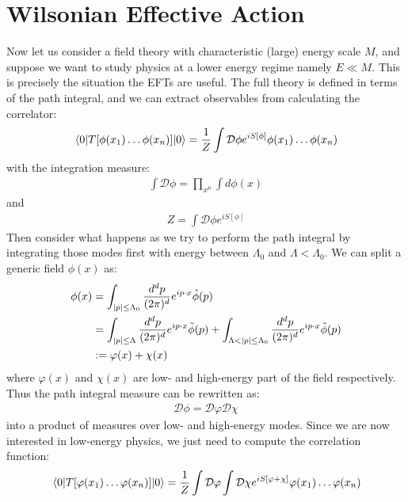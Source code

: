 \section{Wilsonian Effective Action}
Now let us consider a field theory with characteristic (large) energy scale $M$, and suppose we want to study physics at a lower energy regime namely $E \ll M$. This is precisely the situation the EFTs are useful. The full theory is defined in terms of the path integral, and we can extract observables from calculating the correlator:
\begin{align}
    \mel{0}{T[\phi(x_{1}) \dotso \phi(x_{n})]}{0} = \frac{1}{Z}\int \mathcal{D} \phi e^{iS[\phi]} \phi(x_{1}) \dots \phi(x_{n})
\end{align}
with the integration measure:
\begin{align}
    \int \mathcal{D}\phi = \prod_{x^{\mu}} \int d\phi(x)
\end{align}
and
\begin{align}
    Z = \int \mathcal{D}\phi e^{iS[\phi]}
\end{align}
Then consider what happens as we try to perform the path integral by integrating those modes first with energy between $\Lambda _{0}$ and $\Lambda < \Lambda_{0}$. We can split a generic field $\phi(x)$ as:
\begin{align}
    \begin{split}
        \phi(x) &= \int _{\abs{p} \le \Lambda_{0}} \frac{d^{d}p}{(2\pi)^{d}} e^{ip\cdot x} \tilde{\phi}(p) \\
        &= \int _{\abs{p} \le \Lambda} \frac{d^{d}p}{(2\pi)^{d}} e^{ip\cdot x} \tilde{\phi}(p) + \int _{\Lambda < \abs{p} \le \Lambda _{0}} \frac{d^{d}p}{(2\pi)^{d}} e^{ip\cdot x} \tilde{\phi}(p) \\
        & := \varphi (x) + \chi (x)
    \end{split}
\end{align}
where $\varphi(x)$ and $\chi(x)$ are low- and high-energy part of the field respectively. Thus the path integral measure can be rewritten as:
\begin{align}
    \mathcal{D}\phi = \mathcal{D} \varphi \mathcal{D} \chi
\end{align}
into a product of measures over low- and high-energy modes. Since we are now interested in low-energy physics, we just need to compute the correlation function:
\begin{align}
    \mel{0}{T[\varphi(x_{1}) \dotso \varphi(x_{n})]}{0} = \frac{1}{Z} \int \mathcal{D} \varphi \int \mathcal{D} \chi e^{iS[\varphi + \chi]} \varphi(x_{1}) \dotso \varphi(x_{n})
\end{align}

